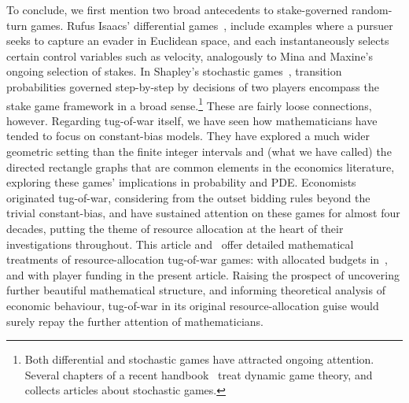 \documentclass[letterpaper,11pt,oneside,reqno]{amsbook}
\numberwithin{figure}{chapter}
\theoremstyle{definition}
\theoremstyle{definition}
\theoremstyle{definition}
\theoremstyle{definition}
\theoremstyle{definition}
\begin{document}
To conclude, we first mention two broad 
antecedents to stake-governed random-turn games. Rufus Isaacs' differential games~\cite{Isaacs65}, include examples where a pursuer seeks to capture an evader in Euclidean space, and each instantaneously selects certain
control variables such as velocity, analogously to Mina and Maxine's ongoing selection of stakes. In Shapley's stochastic games~\cite{Shapley1953},  transition probabilities governed step-by-step by decisions of two players encompass the stake game framework in a broad sense.\footnote{Both differential and stochastic games have attracted ongoing attention. Several chapters of a recent handbook~\cite{HandbookDynamicGameTheory} treat dynamic game theory, and~\cite{StochasticGamesRelatedTopics} collects articles about stochastic games.} 
These are fairly loose connections, however. Regarding tug-of-war itself, we have seen how mathematicians have tended to focus on constant-bias models.
They have explored a much wider geometric setting than the  finite integer intervals and (what we have called) the directed rectangle graphs that are common elements in the economics literature, 
 exploring these games' implications in probability and PDE. Economists originated tug-of-war, considering from the outset bidding rules beyond the trivial constant-bias, and have sustained attention on these games for almost four decades, putting the theme of resource allocation at the heart of their investigations throughout. 
This article and~\cite{HP2022} offer detailed mathematical treatments of resource-allocation tug-of-war games: with allocated budgets in~\cite{HP2022}, and with player funding in the present article.
Raising the prospect of uncovering further beautiful mathematical structure, and informing theoretical analysis of economic behaviour, tug-of-war in its original resource-allocation guise would surely repay the further attention of mathematicians.
\end{document}
